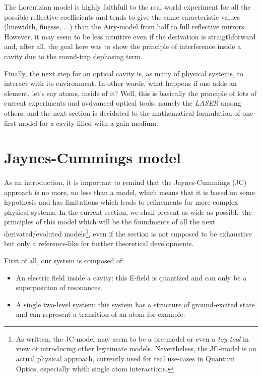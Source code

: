 \documentclass[10pt]{report}
\begin{document}
The Lorentzian model is highly faithfull to the real world experiment for all the possible reflective coefficients and tends to give the same caracteristic values (linewidth, finesse, ...) than the Airy-model from half to full reflective mirrors. However, it may seem to be less intuitive even if the derivation is straigthforward and, after all, the goal here was to show the principle of interference inside a cavity due to the round-trip dephasing term.

Finally, the next step for an optical cavity is, as many of physical systems, to interact with its environment. In other words, what happens if one adds an element, let's say atoms, inside of it? Well, this is basically the principle of lots of current experiments and avdvanced optical tools, namely the \textit{LASER} among others, and the next section is decidated to the mathematical formulation of one first model for a cavity filled with a gain medium.

\section{Jaynes-Cummings model}
\paragraph{}
As an introduction, it is important to remind that the Jaynes-Cummings (JC) approach is no more, no less than a model, which means that it is based on some hypothesis and has limitations which leads to refinements for more complex physical systems. In the current section, we shall present as wide as possible the principles of this model which will be the foundments of all the next derivated/evoluted models\footnote{As written, the JC-model may seem to be a pre-model or even a \textit{toy tool} in view of introducing other legitimate models. Nevertheless, the JC-model is an actual physical approach, currently used for real use-cases in Quantum Optics, especially whith single atom interactions.}, even if the section is not supposed to be exhaustive but only a reference-like for further theoretical developments.

First of all, our system is composed of:
\begin{itemize}
	\item An electric field inside a cavity: this E-field is quantized and can only be a superposition of resonances.
	\item A single two-level system: this system has a structure of ground-excited state and can represent a transition of an atom for example.
\end{itemize}
\end{document}
